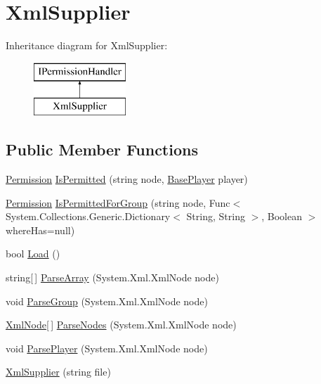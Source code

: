 \hypertarget{classOTA_1_1Permissions_1_1XmlSupplier}{}\section{Xml\+Supplier}
\label{classOTA_1_1Permissions_1_1XmlSupplier}
Inheritance diagram for Xml\+Supplier\+:\begin{figure}[H]
\begin{center}
\leavevmode
\includegraphics[height=2.000000cm]{classOTA_1_1Permissions_1_1XmlSupplier}
\end{center}
\end{figure}
\subsection*{Public Member Functions}
\begin{DoxyCompactItemize}
\item 
\hyperlink{namespaceOTA_1_1Permissions_a5335d23d62bc219ccbf40b018c002e8d}{Permission} \hyperlink{classOTA_1_1Permissions_1_1XmlSupplier_a9f1eaccdce7bdd07256ea0cf8db1f545}{Is\+Permitted} (string node, \hyperlink{classOTA_1_1BasePlayer}{Base\+Player} player)
\item 
\hyperlink{namespaceOTA_1_1Permissions_a5335d23d62bc219ccbf40b018c002e8d}{Permission} \hyperlink{classOTA_1_1Permissions_1_1XmlSupplier_a580e0fd71016f2ebbc000978af5f900f}{Is\+Permitted\+For\+Group} (string node, Func$<$ System.\+Collections.\+Generic.\+Dictionary$<$ String, String $>$, Boolean $>$ where\+Has=null)
\item 
bool \hyperlink{classOTA_1_1Permissions_1_1XmlSupplier_a7a975070c85b3089fd38763926a3ff4c}{Load} ()
\item 
string\mbox{[}$\,$\mbox{]} \hyperlink{classOTA_1_1Permissions_1_1XmlSupplier_a678c2892b601a7f51025f0b679cba986}{Parse\+Array} (System.\+Xml.\+Xml\+Node node)
\item 
void \hyperlink{classOTA_1_1Permissions_1_1XmlSupplier_ad841e8d09c42c1cea1fb2aba32c83b62}{Parse\+Group} (System.\+Xml.\+Xml\+Node node)
\item 
\hyperlink{classOTA_1_1Permissions_1_1XmlNode}{Xml\+Node}\mbox{[}$\,$\mbox{]} \hyperlink{classOTA_1_1Permissions_1_1XmlSupplier_a3829dd94d40ed57af79f7e93e7e10ac5}{Parse\+Nodes} (System.\+Xml.\+Xml\+Node node)
\item 
void \hyperlink{classOTA_1_1Permissions_1_1XmlSupplier_a9633ce858a73ae280d4bad5d2d8da84d}{Parse\+Player} (System.\+Xml.\+Xml\+Node node)
\item 
\hyperlink{classOTA_1_1Permissions_1_1XmlSupplier_a58edca2002d9af6faba9c202bd37de70}{Xml\+Supplier} (string file)
\end{DoxyCompactItemize}


